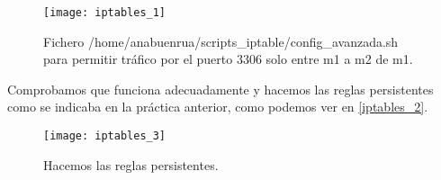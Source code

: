 \begin{figure}[h!]
\begin{center}
\caption{Fichero /home/anabuenrua/scripts\_iptable/config\_avanzada.sh para permitir tráfico por el puerto 3306 solo entre m1 a m2 de m1.}
\label{iptables_1}
\texttt{[image: iptables\_1]}
\end{center}
\end{figure}

Comprobamos que funciona adecuadamente y hacemos las reglas persistentes como se indicaba en la práctica anterior, como podemos ver en \eqref{iptables_2}.

\begin{figure}[h!]
\begin{center}
\caption{Hacemos las reglas persistentes.}
\label{iptables_2}
\texttt{[image: iptables\_3]}
\end{center}
\end{figure}

